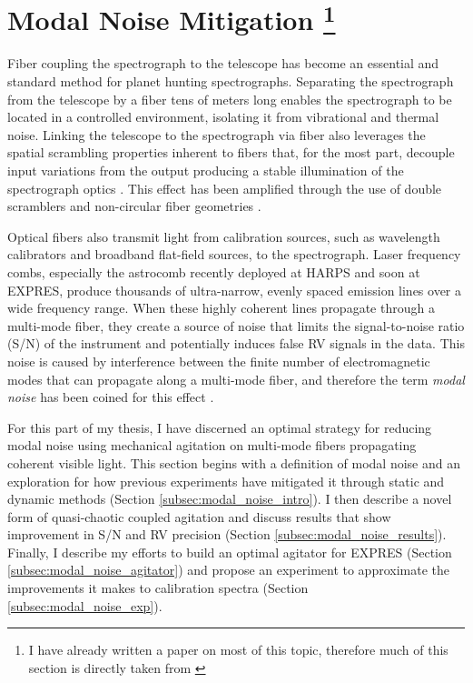 \documentclass[11pt]{article}
\begin{document}
\section{Modal Noise Mitigation \footnote{I have already written a paper on most of this topic, therefore much of this section is directly taken from \cite{Petersburg2018}}}
\label{sec:modal_noise}

Fiber coupling the spectrograph to the telescope has become an essential and standard method for planet hunting spectrographs. Separating the spectrograph from the telescope by a fiber tens of meters long enables the spectrograph to be located in a controlled environment, isolating it from vibrational and thermal noise. Linking the telescope to the spectrograph via fiber also leverages the spatial scrambling properties inherent to fibers that, for the most part, decouple input variations from the output producing a stable illumination of the spectrograph optics \cite{Hunter1992}. This effect has been amplified through the use of double scramblers \cite{Halverson2015a, Spronck2015} and non-circular fiber geometries \cite{Chazelas2010, Spronck2012, Plavchan2013}.

Optical fibers also transmit light from calibration sources, such as wavelength calibrators and broadband flat-field sources, to the spectrograph. Laser frequency combs, especially the  astrocomb \cite{Probst2014} recently deployed at HARPS and soon at EXPRES, produce thousands of ultra-narrow, evenly spaced emission lines over a wide frequency range. When these highly coherent lines propagate through a multi-mode fiber, they create a source of noise that limits the signal-to-noise ratio (S/N) of the instrument and potentially induces false RV signals in the data. This noise is caused by interference between the finite number of electromagnetic modes that can propagate along a multi-mode fiber, and therefore the term \textit{modal noise} has been coined for this effect \cite{Epworth1978}.

For this part of my thesis, I have discerned an optimal strategy for reducing modal noise using mechanical agitation on multi-mode fibers propagating coherent visible light. This section begins with a definition of modal noise and an exploration for how previous experiments have mitigated it through static and dynamic methods (Section \ref{subsec:modal_noise_intro}). I then describe a novel form of quasi-chaotic coupled agitation and discuss results that show improvement in S/N and RV precision (Section \ref{subsec:modal_noise_results}). Finally, I describe my efforts to build an optimal agitator for EXPRES (Section \ref{subsec:modal_noise_agitator}) and propose an experiment to approximate the improvements it makes to calibration spectra (Section \ref{subsec:modal_noise_exp}).
\end{document}
